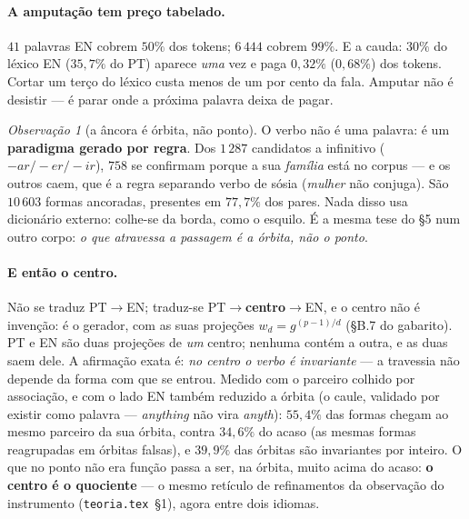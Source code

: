 \documentclass[11pt]{article}
\theoremstyle{plain}
\theoremstyle{remark}
\newtheorem{obs}{Observação}
\begin{document}
\paragraph{A amputação tem preço tabelado.} $41$ palavras EN cobrem $50\%$ dos tokens; $6\,444$ cobrem
$99\%$. E a cauda: $30\%$ do léxico EN ($35{,}7\%$ do PT) aparece \emph{uma} vez e paga $0{,}32\%$
($0{,}68\%$) dos tokens. Cortar um terço do léxico custa menos de um por cento da fala. Amputar não é
desistir --- é parar onde a próxima palavra deixa de pagar.

\begin{obs}[a âncora é órbita, não ponto]\label{obs:orbita}
O verbo não é uma palavra: é um \textbf{paradigma gerado por regra}. Dos $1\,287$ candidatos a
infinitivo ($-ar/-er/-ir$), $758$ se confirmam porque a sua \emph{família} está no corpus --- e os
outros caem, que é a regra separando verbo de sósia (\emph{mulher} não conjuga). São $10\,603$ formas
ancoradas, presentes em $77{,}7\%$ dos pares. Nada disso usa dicionário externo: colhe-se da borda, como
o esquilo. É a mesma tese do §5 num outro corpo: \emph{o que atravessa a passagem é a órbita, não o
ponto}.
\end{obs}

\paragraph{E então o centro.} Não se traduz PT$\to$EN; traduz-se PT$\to$\textbf{centro}$\to$EN, e o
centro não é invenção: é o gerador, com as suas projeções $w_d=g^{(p-1)/d}$ (§B.7 do gabarito). PT e EN
são duas projeções de \emph{um} centro; nenhuma contém a outra, e as duas saem dele. A afirmação exata
é: \emph{no centro o verbo é invariante} --- a travessia não depende da forma com que se entrou. Medido
com o parceiro colhido por associação, e com o lado EN também reduzido a órbita (o caule, validado por
existir como palavra --- \emph{anything} não vira \emph{anyth}): $55{,}4\%$ das formas chegam ao mesmo
parceiro da sua órbita, contra $34{,}6\%$ do acaso (as mesmas formas reagrupadas em órbitas falsas), e
$39{,}9\%$ das órbitas são invariantes por inteiro. O que no ponto não era função passa a ser, na
órbita, muito acima do acaso: \textbf{o centro é o quociente} --- o mesmo retículo de refinamentos da
observação do instrumento (\texttt{teoria.tex}~§1), agora entre dois idiomas.
\end{document}
